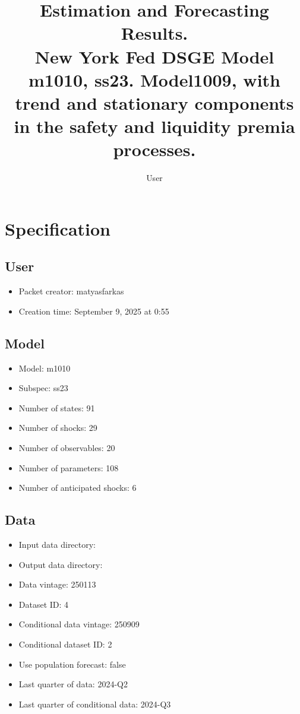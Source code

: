 \documentclass{article}
\title{Estimation and Forecasting Results. \\ New York Fed DSGE Model m1010, ss23. Model1009, with trend and stationary components in the safety and liquidity premia processes.}
\author{User}
\begin{document}
\maketitle


\section{Specification}

\subsection{User}

\begin{itemize}
  \item Packet creator: matyasfarkas
  \item Creation time: September 9, 2025 at 0:55
\end{itemize}

\subsection{Model}

\begin{itemize}
  \item Model: m1010
  \item Subspec: ss23
  \item Number of states: 91
  \item Number of shocks: 29
  \item Number of observables: 20
  \item Number of parameters: 108
  \item Number of anticipated shocks: 6
\end{itemize}

\subsection{Data}

\begin{itemize}
  \item Input data directory: 
  \item Output data directory: 
  \item Data vintage: 250113
  \item Dataset ID: 4
  \item Conditional data vintage: 250909
  \item Conditional dataset ID: 2
  \item Use population forecast: false
  \item Last quarter of data: 2024-Q2
  \item Last quarter of conditional data: 2024-Q3
\end{itemize}
\end{document}
